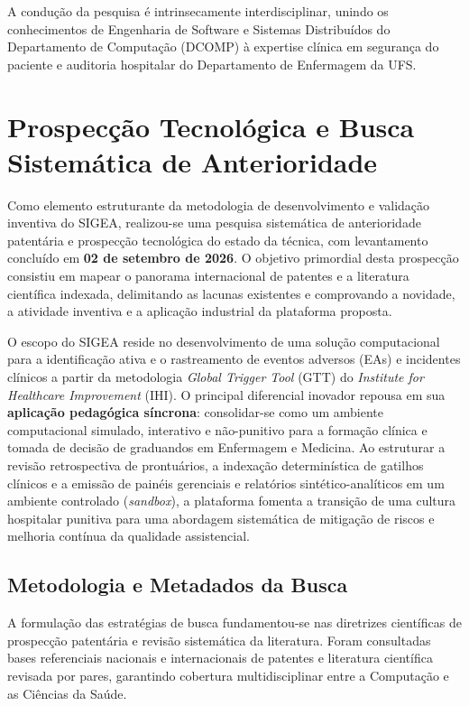 A condução da pesquisa é intrinsecamente interdisciplinar, unindo os conhecimentos de Engenharia de Software e Sistemas Distribuídos do Departamento de Computação (DCOMP) à expertise clínica em segurança do paciente e auditoria hospitalar do Departamento de Enfermagem da UFS.

\section{Prospecção Tecnológica e Busca Sistemática de Anterioridade}
\label{sec:prospeccao-anterioridade}

Como elemento estruturante da metodologia de desenvolvimento e validação inventiva do SIGEA, realizou-se uma pesquisa sistemática de anterioridade patentária e prospecção tecnológica do estado da técnica, com levantamento concluído em \textbf{02 de setembro de 2026}. O objetivo primordial desta prospecção consistiu em mapear o panorama internacional de patentes e a literatura científica indexada, delimitando as lacunas existentes e comprovando a novidade, a atividade inventiva e a aplicação industrial da plataforma proposta.

O escopo do SIGEA reside no desenvolvimento de uma solução computacional para a identificação ativa e o rastreamento de eventos adversos (EAs) e incidentes clínicos a partir da metodologia \textit{Global Trigger Tool} (GTT) do \textit{Institute for Healthcare Improvement} (IHI). O principal diferencial inovador repousa em sua \textbf{aplicação pedagógica síncrona}: consolidar-se como um ambiente computacional simulado, interativo e não-punitivo para a formação clínica e tomada de decisão de graduandos em Enfermagem e Medicina. Ao estruturar a revisão retrospectiva de prontuários, a indexação determinística de gatilhos clínicos e a emissão de painéis gerenciais e relatórios sintético-analíticos em um ambiente controlado (\textit{sandbox}), a plataforma fomenta a transição de uma cultura hospitalar punitiva para uma abordagem sistemática de mitigação de riscos e melhoria contínua da qualidade assistencial.

\subsection{Metodologia e Metadados da Busca}
\label{subsec:metodologia-busca-anterioridade}

A formulação das estratégias de busca fundamentou-se nas diretrizes científicas de prospecção patentária e revisão sistemática da literatura. Foram consultadas bases referenciais nacionais e internacionais de patentes e literatura científica revisada por pares, garantindo cobertura multidisciplinar entre a Computação e as Ciências da Saúde.

